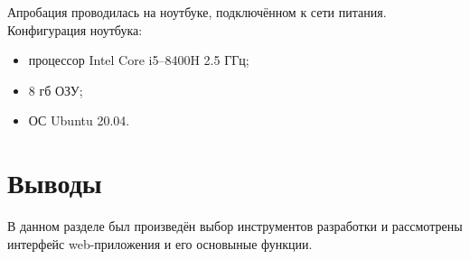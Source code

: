 Апробация проводилась на ноутбуке, подключённом к сети питания. Конфигурация ноутбука:
\begin{itemize}
    \item процессор Intel Core i5--8400H 2.5 ГГц;
    \item 8 гб ОЗУ;
    \item ОС Ubuntu 20.04.
\end{itemize}

\section{Выводы}%
\label{sec:vyvody_impl}

В данном разделе был произведён выбор инструментов разработки и рассмотрены интерфейс web-приложения и его основыные функции.
